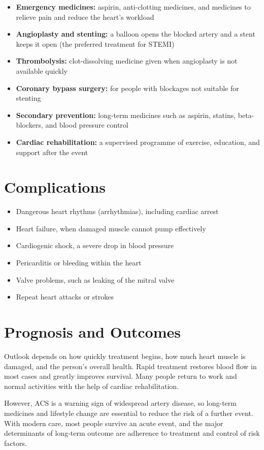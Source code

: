 \begin{itemize}
    \item \textbf{Emergency medicines:} aspirin, anti-clotting medicines, and medicines to relieve pain and reduce the heart's workload
    \item \textbf{Angioplasty and stenting:} a balloon opens the blocked artery and a stent keeps it open (the preferred treatment for STEMI)
    \item \textbf{Thrombolysis:} clot-dissolving medicine given when angioplasty is not available quickly
    \item \textbf{Coronary bypass surgery:} for people with blockages not suitable for stenting
    \item \textbf{Secondary prevention:} long-term medicines such as aspirin, statins, beta-blockers, and blood pressure control
    \item \textbf{Cardiac rehabilitation:} a supervised programme of exercise, education, and support after the event
\end{itemize}

\section*{Complications}
\begin{itemize}
    \item Dangerous heart rhythms (arrhythmias), including cardiac arrest
    \item Heart failure, when damaged muscle cannot pump effectively
    \item Cardiogenic shock, a severe drop in blood pressure
    \item Pericarditis or bleeding within the heart
    \item Valve problems, such as leaking of the mitral valve
    \item Repeat heart attacks or strokes
\end{itemize}

\section*{Prognosis and Outcomes}
Outlook depends on how quickly treatment begins, how much heart muscle is damaged, and the person's overall health. Rapid treatment restores blood flow in most cases and greatly improves survival. Many people return to work and normal activities with the help of cardiac rehabilitation.

However, ACS is a warning sign of widespread artery disease, so long-term medicines and lifestyle change are essential to reduce the risk of a further event. With modern care, most people survive an acute event, and the major determinants of long-term outcome are adherence to treatment and control of risk factors.


